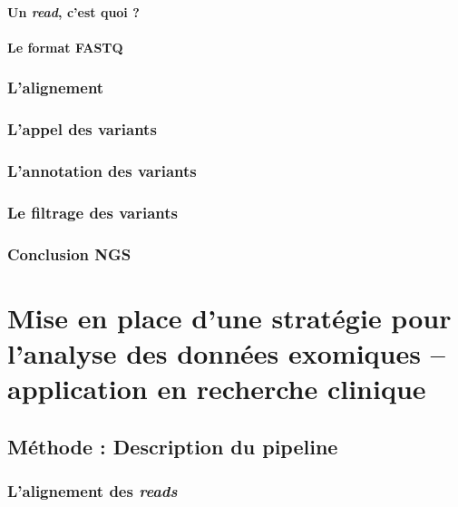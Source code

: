 \documentclass[12pt,twoside]{ugathesis}
\begin{document}
\subsubsection{\texorpdfstring{Un \emph{read}, c'est quoi
?}{Un read, c'est quoi ?}}\label{un-read-cest-quoi}

\subsubsection{Le format FASTQ}\label{fastq}

\subsection{L'alignement}\label{lalignement}

\subsection{L'appel des variants}\label{varcall}

\subsection{L'annotation des variants}\label{lannotation-des-variants}

\subsection{Le filtrage des variants}\label{le-filtrage-des-variants}

\subsection{Conclusion NGS}\label{conclusion-ngs}

\chapter{Mise en place d'une stratégie pour l'analyse des données
exomiques -- application en recherche
clinique}\label{mise-en-place-dune-strategie-pour-lanalyse-des-donnees-exomiques-application-en-recherche-clinique}

\section{Méthode : Description du
pipeline}\label{methode-description-du-pipeline}

\subsection{\texorpdfstring{L'alignement des
\emph{reads}}{L'alignement des reads}}\label{lalignement-des-reads}
\end{document}
